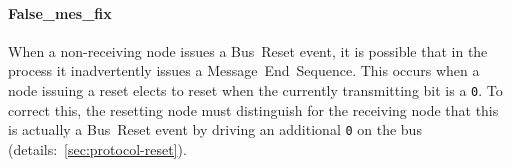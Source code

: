 \paragraph{\sc False\_mes\_fix}
When a non-receiving node issues a Bus~Reset event, it is possible that in the
process it inadvertently issues a Message~End~Sequence. This occurs when a
node issuing a reset elects to reset when the currently transmitting bit is a
{\tt 0}. To correct this, the resetting node must distinguish for the
receiving node that this is actually a Bus~Reset event by driving an
additional {\tt 0} on the bus (details:~\ref{sec:protocol-reset}).
